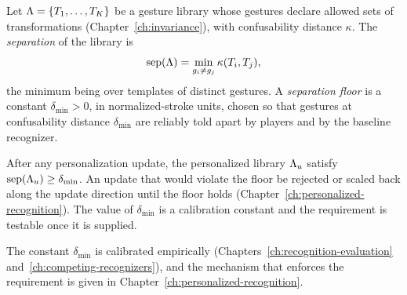 \begin{definition}\label{def:separation}
Let $\Lambda=\{T_1,\dots,T_K\}$ be a gesture library whose gestures declare allowed sets of transformations (Chapter~\ref{ch:invariance}), with confusability distance $\kappa$. The \emph{separation} of the library is
\[
\operatorname{sep}(\Lambda)=\min_{g_i\ne g_j}\kappa(T_i,T_j),
\]
the minimum being over templates of distinct gestures. A \emph{separation floor} is a constant $\delta_{\min}>0$, in normalized-stroke units, chosen so that gestures at confusability distance $\delta_{\min}$ are reliably told apart by players and by the baseline recognizer.
\end{definition}

\begin{requirement}\label{req:floor}
After any personalization update, the personalized library $\Lambda_u$ \must{} satisfy $\operatorname{sep}(\Lambda_u)\ge\delta_{\min}$. An update that would violate the floor \must{} be rejected or scaled back along the update direction until the floor holds (Chapter~\ref{ch:personalized-recognition}).\evS{} The value of $\delta_{\min}$ is a calibration constant\evC{} and the requirement is testable once it is supplied.
\end{requirement}

The constant $\delta_{\min}$ is calibrated empirically (Chapters~\ref{ch:recognition-evaluation} and~\ref{ch:competing-recognizers}), and the mechanism that enforces the requirement is given in Chapter~\ref{ch:personalized-recognition}.
